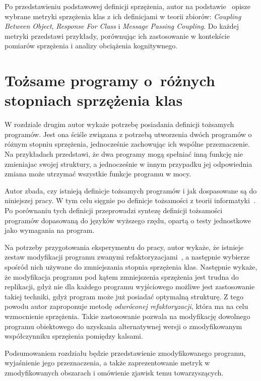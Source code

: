Po przedstawieniu podstawowej definicji sprzężenia, autor na podstawie~\cite{briand1999unified} opisze
wybrane metryki sprzężenia klas z ich definicjami w teorii zbiorów: \textit{Coupling Between Object},
\textit{Response For Class} i \textit{Message Passing Coupling}.
Do każdej metryki przedstawi przykłady, porównując ich zastosowanie w kontekście pomiarów sprzężenia
i analizy obciążenia kognitywnego.

\chapter{Tożsame programy o~różnych stopniach sprzężenia klas}

W rozdziale drugim autor wykaże potrzebę posiadania definicji tożsamych programów.
Jest ona ściśle związana z potrzebą utworzenia dwóch programów o różnym stopniu sprzężenia, jednocześnie
zachowując ich wspólne przeznaczenie.
Na przykładach przedstawi, że dwa programy mogą spełniać inną funkcję nie zmieniajac swojej struktury, a
jednocześnie w innym przypadku jej odpowiednia zmiana może utrzymać wszystkie funkcje programu w mocy.

Autor zbada, czy istnieją definicje tożsamych programów i jak dospasowane są do niniejszej pracy.
W tym celu sięgnie po definicje tożsamości z teorii informatyki~\cite{tzevelekos2012program, churchill2019semantic}.
Po porównaniu tych definicji przeprowadzi syntezę definicji tożsamości programów dopasowaną do języków wyższego rzędu,
opartą o testy jednostkowe jako wymagania na program.

Na potrzeby przygotowania eksperymentu do pracy, autor wykaże, że istnieje zestaw modyfikacji programu zwanymi
refaktoryzacjami~\cite{fowler2018refactoring}, a następnie wybierze spośród nich używane do zmniejszania stopnia
sprzężenia klas.
Następnie wykaże, że modyfikacja programu pod kątem zmniejszenia sprzężenia jest trudna do replikacji, gdyż nie
dla każdego programu wyjściowego możliwe jest zastosowanie takiej techniki, gdyż program może już posiadać
optymalną strukturę.
Z tego powodu autor zaproponuje metodę \textit{odwróconej refaktoryzacji}, która ma na celu wzmocnienie sprzężenia.
Takie zastosowanie pozwala na modyfikację dowolnego programu obiektowego do uzyskania alternatywnej wersji o
zmodyfikowanym współczynniku sprzężenia pomiędzy kalsami.

Podsumowaniem rozdziału będzie przedstawienie zmodyfikowanego programu, wyjaśnienie jego przeznaczenia, a także
zaprezentowanie metryk w zmodyfikowanych obszarach i omówienie zjawisk temu towarzyszących.

